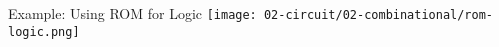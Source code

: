 




    

\begin{frame}{Example: Using ROM for Logic}
     \texttt{[image: 02-circuit/02-combinational/rom-logic.png]}
 \end{frame}
